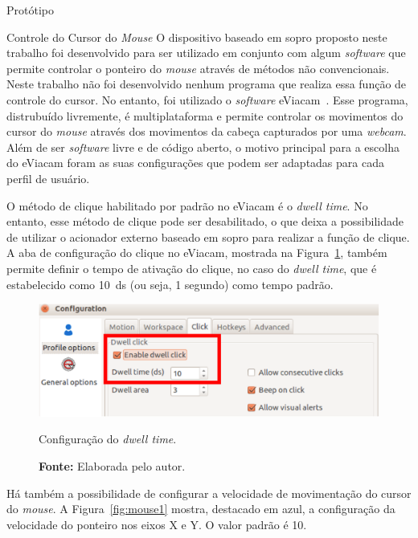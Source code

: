 \begin{chapter}{Protótipo}
\begin{section}{Controle do Cursor do \textit{Mouse}}
O dispositivo baseado em sopro proposto neste trabalho foi desenvolvido para ser
utilizado em conjunto com algum \textit{software} que permite controlar o
ponteiro do \textit{mouse} através de métodos não convencionais. Neste trabalho
não foi desenvolvido nenhum programa que realiza essa função de controle do
cursor. No entanto, foi utilizado o \textit{software} eViacam~\cite{eviacam}.
Esse programa, distrubuído livremente, é multiplataforma e permite controlar os
movimentos do cursor do \textit{mouse} através dos movimentos da cabeça
capturados por uma \textit{webcam}. Além de ser \textit{software} livre e de
código aberto, o motivo principal para a escolha do eViacam foram as suas
configurações que podem ser adaptadas para cada perfil de usuário.

O método de clique habilitado por padrão no eViacam é o \textit{dwell time}. No
entanto, esse método de clique pode ser desabilitado, o que deixa a
possibilidade de utilizar o acionador externo baseado em sopro para realizar a
função de clique. A aba de configuração do clique no eViacam, mostrada na
Figura~\ref{fig:click}, também permite definir o tempo de ativação do clique, no
caso do \textit{dwell time}, que é estabelecido como 10~ds (ou seja, 1 segundo)
como tempo padrão. 

\begin{figure}[!h]
	\centering
	\begin{minipage}[c]{\textwidth}
	\centering
	\includegraphics[width=0.6\linewidth]{fig/eviacamclick}
	\caption{Configuração do \textit{dwell time}.}
	\vspace{-1cm}
	\caption*{\textbf{Fonte: }Elaborada pelo autor.}
	\label{fig:click}
	\end{minipage}
\end{figure}
\vspace{-0.75cm}
 
Há também a possibilidade de configurar a velocidade de movimentação do cursor
do \textit{mouse}. A Figura~\ref{fig:mouse1} mostra, destacado em azul, a
configuração da velocidade do ponteiro nos eixos X e Y. O valor padrão é 10.


\end{section}
\end{chapter}
